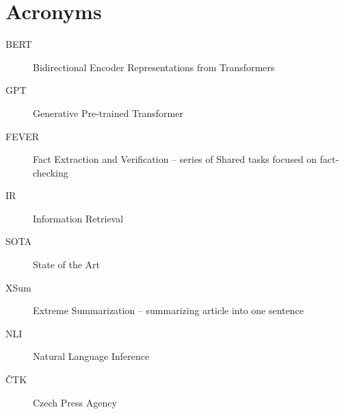 \documentclass[oneside]{ctuthesis}
\theoremstyle{plain}
\theoremstyle{definition}
\theoremstyle{note}
\begin{document}
\maketitle








%


\appendix
%
\chapter{Acronyms}
\begin{description}
\item[BERT] Bidirectional Encoder Representations from Transformers
\item[GPT] Generative Pre-trained Transformer 
\item[FEVER] Fact Extraction and Verification -- series of Shared tasks focused on fact-checking
\item[IR] Information Retrieval
\item[SOTA] State of the Art
\item[XSum] Extreme Summarization -- summarizing article into one sentence
\item[NLI] Natural Language Inference
\item[ČTK] Czech Press Agency
\end{description}
\end{document}
